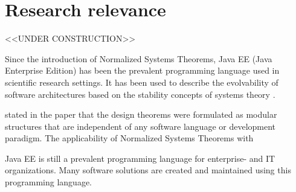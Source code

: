 \section{Research relevance} \label{research_relevance} 

<<UNDER CONSTRUCTION>>

Since the introduction of Normalized Systems Theorems, Java EE (Java Enterprise Edition)
has been the prevalent programming language used in scientific research settings. It has
been used to describe the evolvability of software architectures based on the stability
concepts of systems theory \parencite[]{mannaert_towards_2012}.

\citeauthor{mannaert_towards_2012} stated in the paper that the design theorems were
formulated as modular structures that are independent of any software language or
development paradigm. The applicability of Normalized Systems Theorems with

Java EE is still a prevalent programming language for enterprise- and IT organizations.
Many software solutions are created and maintained using this programming language.
